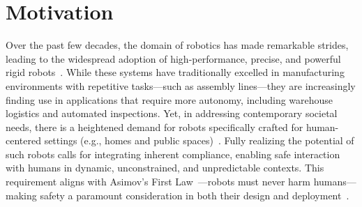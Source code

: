\section{Motivation}\label{sec:introduction:motivation}

Over the past few decades, the domain of robotics has made remarkable strides, leading to the widespread adoption of high-performance, precise, and powerful rigid robots~\cite{todd1996fundamentals}. While these systems have traditionally excelled in manufacturing environments with repetitive tasks—such as assembly lines—they are increasingly finding use in applications that require more autonomy, including warehouse logistics and automated inspections. Yet, in addressing contemporary societal needs, there is a heightened demand for robots specifically crafted for human-centered settings (e.g., homes and public spaces)~\cite{nahavandi2019industry, chibani2013ubiquitous, royakkers2015literature, he2021challenges}. Fully realizing the potential of such robots calls for integrating inherent compliance, enabling safe interaction with humans in dynamic, unconstrained, and unpredictable contexts. This requirement aligns with Asimov’s First Law~\cite{asimov1941three}—robots must never harm humans—making safety a paramount consideration in both their design and deployment~\cite{villani2018survey}.


